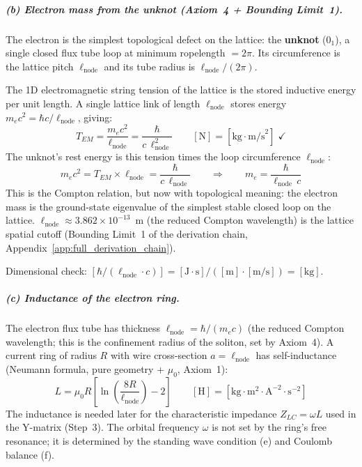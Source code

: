 \subparagraph{(b) Electron mass from the unknot (Axiom~4 + Bounding Limit~1).}
The electron is the simplest topological defect on the lattice:
the \textbf{unknot} ($0_1$), a single closed flux tube loop
at minimum ropelength $= 2\pi$.  Its circumference is the
lattice pitch $\ell_{\text{node}}$ and its tube radius is
$\ell_{\text{node}}/(2\pi)$.

The 1D electromagnetic string tension of the lattice is the
stored inductive energy per unit length.  A single lattice
link of length $\ell_{\text{node}}$ stores energy
$m_e c^2 = \hbar c / \ell_{\text{node}}$, giving:
\begin{equation}
    T_{EM} = \frac{m_e c^2}{\ell_{\text{node}}}
    = \frac{\hbar}{c\,\ell_{\text{node}}^2}
    \qquad [\text{N}] = [\text{kg}\cdot\text{m/s}^2]\;\checkmark
    \label{eq:T_EM}
\end{equation}
The unknot's rest energy is this tension times the loop
circumference $\ell_{\text{node}}$:
\begin{equation}
    m_e c^2 = T_{EM} \times \ell_{\text{node}}
    = \frac{\hbar}{c\,\ell_{\text{node}}}
    \qquad\Longrightarrow\qquad
    \boxed{m_e = \frac{\hbar}{\ell_{\text{node}}\,c}}
    \label{eq:me_unknot}
\end{equation}
This is the Compton relation, but now with topological meaning:
the electron mass is the ground-state eigenvalue of the
simplest stable closed loop on the lattice.
$\ell_{\text{node}} \approx 3.862 \times 10^{-13}$~m
(the reduced Compton wavelength) is the lattice spatial cutoff
(Bounding Limit~1 of the derivation chain,
Appendix~\ref{app:full_derivation_chain}).

Dimensional check:
$[\hbar / (\ell_{\text{node}} \cdot c)]
= [\text{J}\cdot\text{s}] / ([\text{m}] \cdot [\text{m/s}])
= [\text{kg}]$.\;\checkmark

\subparagraph{(c) Inductance of the electron ring.}
The electron flux tube has thickness
$\ell_{\text{node}} = \hbar / (m_e c)$ (the reduced
Compton wavelength; this is the confinement radius
of the soliton, set by Axiom~4).
A current ring of radius $R$ with wire cross-section
$a = \ell_{\text{node}}$ has self-inductance
(Neumann formula, pure geometry + $\mu_0$, Axiom~1):
\begin{equation}
    L = \mu_0 R \left[\ln\!\left(
    \frac{8R}{\ell_{\text{node}}}\right) - 2\right]
    \qquad [\text{H}] = [\text{kg}\cdot\text{m}^2
    \cdot\text{A}^{-2}\cdot\text{s}^{-2}]
    \label{eq:L_ring}
\end{equation}
The inductance is needed later for the characteristic
impedance $Z_{LC} = \omega L$ used in the Y-matrix
(Step~3).  The orbital frequency $\omega$ is not set
by the ring's free resonance; it is determined by the
standing wave condition (e) and Coulomb balance (f).

